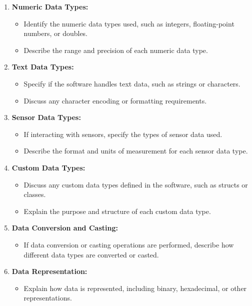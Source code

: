 \begin{enumerate}
    \item \textbf{Numeric Data Types:}
    \begin{itemize}
        \item Identify the numeric data types used, such as integers, floating-point numbers, or doubles.
        \item Describe the range and precision of each numeric data type.
    \end{itemize}
    
    \item \textbf{Text Data Types:}
    \begin{itemize}
        \item Specify if the software handles text data, such as strings or characters.
        \item Discuss any character encoding or formatting requirements.
    \end{itemize}
    
    \item \textbf{Sensor Data Types:}
    \begin{itemize}
        \item If interacting with sensors, specify the types of sensor data used.
        \item Describe the format and units of measurement for each sensor data type.
    \end{itemize}
    
    \item \textbf{Custom Data Types:}
    \begin{itemize}
        \item Discuss any custom data types defined in the software, such as structs or classes.
        \item Explain the purpose and structure of each custom data type.
    \end{itemize}
    
    \item \textbf{Data Conversion and Casting:}
    \begin{itemize}
        \item If data conversion or casting operations are performed, describe how different data types are converted or casted.
    \end{itemize}
    
    \item \textbf{Data Representation:}
    \begin{itemize}
        \item Explain how data is represented, including binary, hexadecimal, or other representations.
    \end{itemize}
\end{enumerate}



